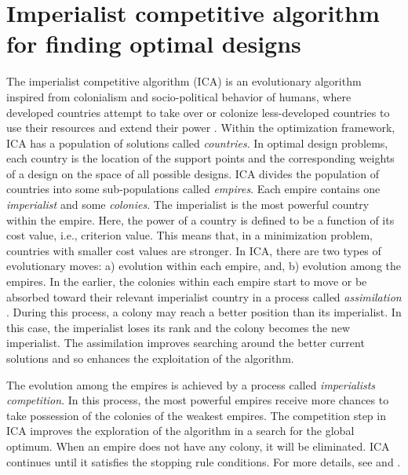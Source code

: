 \section{Imperialist competitive algorithm for finding optimal designs}
\label{sec:ICA}
The imperialist competitive algorithm (ICA) is an evolutionary algorithm inspired from colonialism and socio-political behavior of humans, where developed countries attempt to take over or colonize less-developed countries  to use their resources and  extend their power \citep{ica2007}. Within the optimization framework,  ICA has a population of solutions called {\it countries}. In optimal design problems, each country is the location of the  support  points and the corresponding weights of a design on the space of all possible designs.
ICA divides the population of countries into some sub-populations called {\it empires}. Each empire contains one {\it imperialist} and some {\it colonies}.  The imperialist is the most powerful country within the empire. Here,  the power of a country is defined to be a function of its cost value, i.e., criterion value. This means that, in a minimization problem, countries with smaller cost values are stronger.
In ICA, there are two types of evolutionary moves: a) evolution within  each empire, and, b) evolution among the empires.
In the earlier, the colonies within each empire start to move or be absorbed  toward their relevant imperialist country  in a process  called {\it assimilation} \citep{lin2013imperialist}.
During this process, a colony may reach a  better position than its imperialist.  In this case, the imperialist loses its rank and the colony becomes the new imperialist.
The assimilation  improves searching around the better current solutions and so enhances the exploitation of the algorithm.

The evolution among the empires is achieved by a process called  {\it imperialists competition}. In this process, the most powerful empires receive more chances to take  possession of the colonies of the weakest empires. The competition step in ICA improves  the exploration of the algorithm in a search for the global optimum.
When an empire does not have any colony, it will be eliminated.
ICA continues until it satisfies the stopping rule conditions.
For more details, see \citet{ica2007} and \citet{hosseini2014}.

